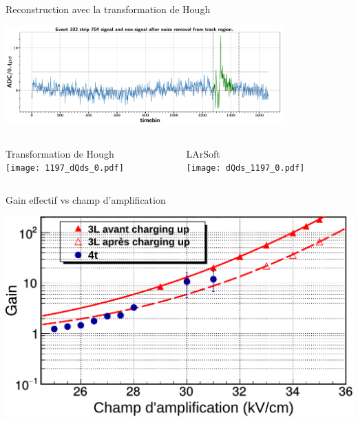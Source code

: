     \begin{frame}{Reconstruction avec la transformation de Hough}
        \begin{scriptsize}
            \begin{center} \includegraphics[width=0.8\textwidth]{./pictures/cnsub_fromtrack.pdf} \end{center}
            \begin{columns}
                \begin{column}{0.6\textwidth}
                    \centering Transformation de Hough\\
                    \texttt{[image: 1197\_dQds\_0.pdf]}
                \end{column}
                \begin{column}{0.4\textwidth}
                    \centering LArSoft\\
                    \texttt{[image: dQds\_1197\_0.pdf]}
                \end{column}
            \end{columns}
        \end{scriptsize}
    \end{frame}
    
    \begin{frame}{Gain effectif vs champ d'amplification}
        \begin{scriptsize}
            \centering \includegraphics[width=\textwidth]{./pictures/gain_vs_ampli_full.pdf} \\ 
        \end{scriptsize}
    \end{frame}
    

